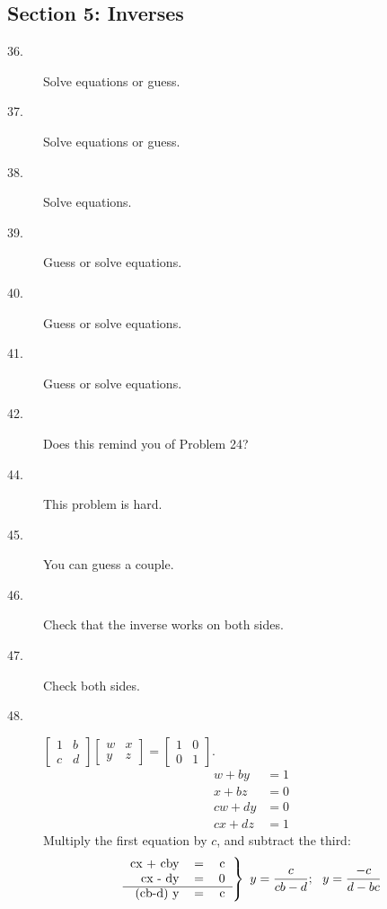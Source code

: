 \documentclass{article}
\begin{document}
\subsection*{Section 5: Inverses}

\begin{description}

  \item[36.] Solve equations or guess. 

  \item[37.] Solve equations or guess. 

  \item[38.] Solve equations. 

  \item[39.] Guess or solve equations. 

  \item[40.] Guess or solve equations. 

  \item[41.] Guess or solve equations. 

  \item[42.] Does this remind you of Problem 24? 

  \item[44.] This problem is hard. 

  \item[45.] You can guess a couple. 

  \item[46.] Check that the inverse works on both sides. 

  \item[47.] Check both sides. 

  \item[48.] $ \begin{bmatrix} 1 & b \\ c & d \end{bmatrix}  \begin{bmatrix} w & x \\ y & z \end{bmatrix}  =  \begin{bmatrix} 1 & 0 \\ 0 & 1 \end{bmatrix}$.
    \begin{align*} 
     w + by & = 1 \\
     x + bz & = 0 \\ 
    cw + dy & = 0 \\
    cx + dz & = 1 
    \end{align*}
    Multiply the first equation by $c$, and subtract the third:
    \begin{equation*}
      \left.
      \begin{tabular}{rrr}
        cx + cby & = & c \\
        cx - dy  & = & 0 \\ 
        \cline{1-3}
        (cb-d) y & = & c
      \end{tabular} 
      \right\}
      \ y = \frac{c}{cb-d};\ \ y = \frac{-c}{d-bc}
    \end{equation*}


\end{description}
\end{document}
